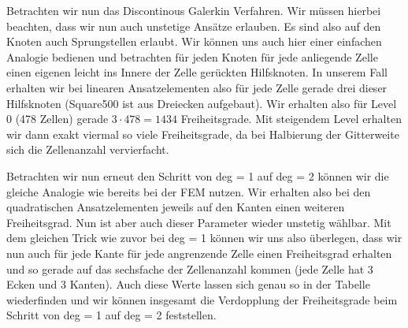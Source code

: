 
Betrachten wir nun das Discontinous Galerkin Verfahren. Wir müssen hierbei beachten, dass wir nun auch unstetige Ansätze erlauben. Es sind also auf den Knoten auch Sprungstellen erlaubt. Wir können uns auch hier einer einfachen Analogie bedienen und betrachten für jeden Knoten für jede anliegende Zelle einen eigenen leicht ins Innere der Zelle gerückten Hilfsknoten. In unserem Fall erhalten wir bei linearen Ansatzelementen also für jede Zelle gerade drei dieser Hilfsknoten (Square500 ist aus Dreiecken aufgebaut). Wir erhalten also für Level 0 (478 Zellen) gerade $3 \cdot 478 = 1434$ Freiheitsgrade. Mit steigendem Level erhalten wir dann exakt viermal so viele Freiheitsgrade, da bei Halbierung der Gitterweite sich die Zellenanzahl vervierfacht. 

Betrachten wir nun erneut den Schritt von deg = 1 auf deg = 2 können wir die gleiche Analogie wie bereits bei der FEM nutzen. Wir erhalten also bei den quadratischen Ansatzelementen jeweils auf den Kanten einen weiteren Freiheitsgrad. Nun ist aber auch dieser Parameter wieder unstetig wählbar. Mit dem gleichen Trick wie zuvor bei deg = 1 können wir uns also überlegen, dass wir nun auch für jede Kante für jede angrenzende Zelle einen Freiheitsgrad erhalten und so gerade auf das sechsfache der Zellenanzahl kommen (jede Zelle hat 3 Ecken und 3 Kanten).
Auch diese Werte lassen sich genau so in der Tabelle wiederfinden und wir können insgesamt die Verdopplung der Freiheitsgrade beim Schritt von deg = 1 auf deg = 2 feststellen.





